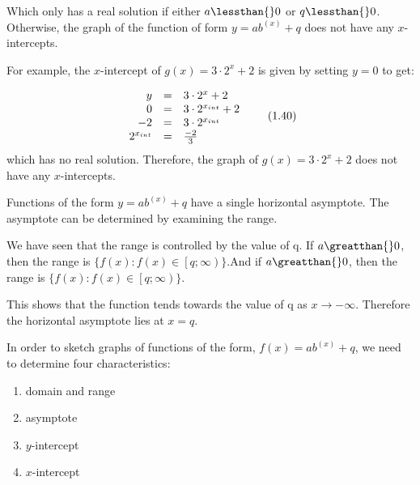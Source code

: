 \label{m39348*id252022}Which only has a real solution if either $a\lessthan{}0$ or $q\lessthan{}0$. Otherwise, the graph of the function of form $y=a{b}^{\left(x\right)}+q$ does not have any $x$-intercepts.\par 
\label{m39348*id252098}For example, the $x$-intercept of $g\left(x\right)=3\ensuremath{\cdot}{2}^{x}+2$ is given by setting $y=0$ to get:\par 
\label{m39348*id252162}\nopagebreak\noindent{}
\begin{equation}
\begin{array}{ccc}\hfill y& =& 3\ensuremath{\cdot}{2}^{x}+2\hfill \\ \hfill 0& =& 3\ensuremath{\cdot}{2}^{{x}_{int}}+2\hfill \\ \hfill -2& =& 3\ensuremath{\cdot}{2}^{{x}_{int}}\hfill \\ \hfill {2}^{{x}_{int}}& =& \frac{-2}{3}\hfill \end{array}\tag{1.40}
\end{equation}
\label{m39348*id252323}which has no real solution. Therefore, the graph of $g\left(x\right)=3\ensuremath{\cdot}{2}^{x}+2$ does not have any $x$-intercepts.\par 
\label{m39348*uid191}
\nopagebreak
\label{m39348*id252384}Functions of the form $y=a{b}^{\left(x\right)}+q$ have a single horizontal asymptote. The asymptote can be determined by examining the range.\par 
\label{m39348*id252423}We have seen that the range is controlled by the value of q. If $a\greatthan{}0$, then the range is $\{f\left(x\right):f\left(x\right)\in \left[q;\infty \right)\}$.And if $a\greatthan{}0$, then the range is $\{f\left(x\right):f\left(x\right)\in \left[q;\infty \right)\}$.\par 
\label{m39348*id7623}This shows that the function tends towards the value of q as $x\to -\infty $. Therefore the horizontal asymptote lies at $x=q$.
\par 
\label{m39348*uid192}
\nopagebreak
\label{m39348*id252708}In order to sketch graphs of functions of the form, $f\left(x\right)=a{b}^{\left(x\right)}+q$, we need to determine four characteristics:\par 
\label{m39348*id252753}\begin{enumerate}[noitemsep, label=\textbf{\arabic*}. ] 
\label{m39348*uid193}\item domain and range
\label{m39348*id64532}\item asymptote
\label{m39348*uid194}\item $y$-intercept
\label{m39348*uid195}\item $x$-intercept
\end{enumerate}

